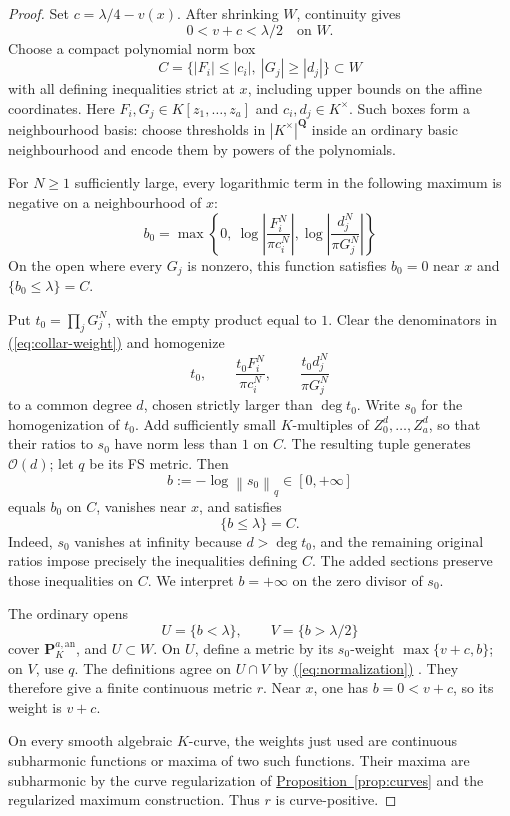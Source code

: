 \documentclass[11pt]{amsart}
\theoremstyle{definition}
\theoremstyle{remark}
\numberwithin{equation}{section}
\newcommand{\an}{\mathrm{an}}
\newcommand{\PP}{\mathbf P}
\newcommand{\OO}{\mathcal O}
\newcommand{\norm}[1]{\left\lVert#1\right\rVert}
\newcommand{\namedref}[2]{%
 \begingroup
 \ifstrequal{#1}{Section}{\hypersetup{linkcolor=sectionteal}}{%
  \ifstrequal{#1}{Appendix}{\hypersetup{linkcolor=sectionteal}}{}}%
 \hyperref[#2]{#1~\ref*{#2}}%
 \endgroup}
\renewcommand{\eqref}[1]{%
 \begingroup\hypersetup{linkcolor=equationviolet}%
 \hyperref[#1]{\textup{(\ref*{#1})}}%
 \endgroup}
\begin{document}
\begin{proof}
Set \(c=\lambda/4-v(x)\).
After shrinking \(W\), continuity gives
\begin{equation}\label{eq:normalization}
 0<v+c<\lambda/2\quad\text{on }W.
\end{equation}
Choose a compact polynomial norm box
\[
 C=\{|F_i|\le|c_i|,\ |G_j|\ge|d_j|\}\subset W
\]
with all defining inequalities strict at \(x\), including upper bounds
on the affine coordinates.
Here \(F_i,G_j\in K[z_1,\ldots,z_a]\) and \(c_i,d_j\in K^\times\).
Such boxes form a neighbourhood basis: choose thresholds in
\(|K^\times|^{\mathbf Q}\) inside an ordinary basic neighbourhood and
encode them by powers of the polynomials.

For \(N\ge1\) sufficiently large, every logarithmic term in the following
maximum is negative on a neighbourhood of \(x\):
\begin{equation}\label{eq:collar-weight}
 b_0=\max\left\{
 0,\ \log\left|\frac{F_i^N}{\pi c_i^N}\right|,
       \log\left|\frac{d_j^N}{\pi G_j^N}\right|
 \right\}
\end{equation}
On the open where every \(G_j\) is nonzero, this function
satisfies \(b_0=0\) near \(x\) and \(\{b_0\le\lambda\}=C\).

Put \(t_0=\prod_jG_j^N\), with the empty product equal to \(1\).
Clear the denominators in \eqref{eq:collar-weight} and homogenize
\[
 t_0,\qquad
 \frac{t_0F_i^N}{\pi c_i^N},\qquad
 \frac{t_0d_j^N}{\pi G_j^N}
\]
to a common degree \(d\), chosen strictly larger than \(\deg t_0\).
Write \(s_0\) for the homogenization of \(t_0\).
Add sufficiently small \(K\)-multiples of
\(Z_0^d,\ldots,Z_a^d\), so that their ratios to \(s_0\) have norm
less than \(1\) on \(C\).
The resulting tuple generates \(\OO(d)\); let \(q\) be its FS metric.
Then
\[
 b:=-\log\norm{s_0}_q\in[0,+\infty]
\]
equals \(b_0\) on \(C\), vanishes near \(x\), and satisfies
\begin{equation}\label{eq:collar-sublevel}
 \{b\le\lambda\}=C.
\end{equation}
Indeed, \(s_0\) vanishes at infinity because \(d>\deg t_0\), and the
remaining original ratios impose precisely the inequalities defining \(C\).
The added sections preserve those inequalities on \(C\).
We interpret \(b=+\infty\) on the zero divisor of \(s_0\).

The ordinary opens
\[
 U=\{b<\lambda\},\qquad V=\{b>\lambda/2\}
\]
cover \(\PP_K^{a,\an}\), and \(U\subset W\).
On \(U\), define a metric by its \(s_0\)-weight
\(\max\{v+c,b\}\); on \(V\), use \(q\).
The definitions agree on \(U\cap V\) by \eqref{eq:normalization}.
They therefore give a finite continuous metric \(r\).
Near \(x\), one has \(b=0<v+c\), so its weight is \(v+c\).

On every smooth algebraic \(K\)-curve, the weights just used are
continuous subharmonic functions or maxima of two such functions.
Their maxima are subharmonic by the curve regularization of
\namedref{Proposition}{prop:curves} and the regularized maximum construction.
Thus \(r\) is curve-positive.
\end{proof}
\end{document}
